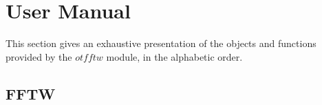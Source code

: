 % 

\section{User Manual}

This section gives an exhaustive presentation of the objects and functions provided by the $otfftw$ module, in the alphabetic order.

\subsection{FFTW}


